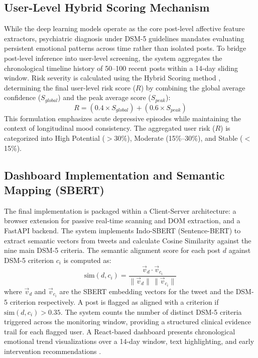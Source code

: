 \documentclass[conference]{IEEEtran}
\begin{document}
\subsection{User-Level Hybrid Scoring Mechanism}
While the deep learning models operate as the core post-level affective feature extractors, psychiatric diagnosis under DSM-5 guidelines mandates evaluating persistent emotional patterns across time rather than isolated posts. To bridge post-level inference into user-level screening, the system aggregates the chronological timeline history of 50--100 recent posts within a 14-day sliding window. Risk severity is calculated using the Hybrid Scoring method \cite{b_coppersmith, b_uban}, determining the final user-level risk score ($R$) by combining the global average confidence ($S_{global}$) and the peak average score ($S_{peak}$):
\begin{equation}
R = (0.4 \times S_{global}) + (0.6 \times S_{peak})
\end{equation}
This formulation emphasizes acute depressive episodes while maintaining the context of longitudinal mood consistency. The aggregated user risk ($R$) is categorized into High Potential ($>$30\%), Moderate (15\%--30\%), and Stable ($<$15\%).

\subsection{Dashboard Implementation and Semantic Mapping (SBERT)}
The final implementation is packaged within a Client-Server
architecture: a browser extension for passive real-time scanning and
DOM extraction, and a FastAPI backend. The system implements
Indo-SBERT (Sentence-BERT) to extract semantic vectors from tweets
and calculate Cosine Similarity against the nine main DSM-5 criteria.
The semantic alignment score for each post $d$ against DSM-5 criterion
$c_i$ is computed as:
\begin{equation}
\text{sim}(d, c_i) = \frac{\vec{v}_d \cdot \vec{v}_{c_i}}{\|\vec{v}_d\| \, \|\vec{v}_{c_i}\|}
\end{equation}
where $\vec{v}_d$ and $\vec{v}_{c_i}$ are the SBERT embedding vectors
for the tweet and the DSM-5 criterion respectively. A post is flagged
as aligned with a criterion if $\text{sim}(d, c_i) > 0.35$. The system
counts the number of distinct DSM-5 criteria triggered across the
monitoring window, providing a structured clinical evidence trail
for each flagged user. A React-based dashboard presents chronological
emotional trend visualizations over a 14-day window, text highlighting,
and early intervention recommendations \cite{b_apa}.
\end{document}
